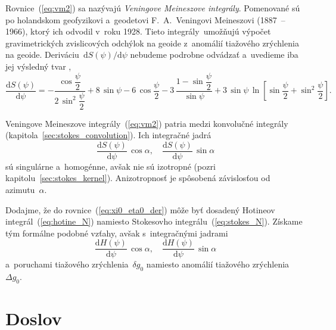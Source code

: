 \documentclass[a4paper, 12pt]{book}
\newcommand{\diff}{\mathrm d}
\begin{document}
Rovnice~(\ref{eq:vm2}) sa nazývajú \emph{Veningove Meineszove integrály}.  
Pomenované sú po holandskom geofyzikovi a~geodetovi F.~A.~Veningovi Meineszovi 
(1887~-- 1966), ktorý ich odvodil v~roku 1928.  Tieto integrály~umožňujú 
výpočet gravimetrických zvislicových odchýlok na geoide z~anomálií tiažového 
zrýchlenia na geoide.  Deriváciu~$\diff S(\psi) \slash \diff\psi$ nebudeme 
podrobne odvádzať a~uvedieme iba jej výsledný tvar
\parencite{MoritzPhysicalGeodesy},
%
\begin{equation}
\frac{\diff S(\psi)}{\diff \psi} = - \frac{\cos\dfrac{\psi}{2}}{2 \, 
\sin^2\dfrac{\psi}{2}} + 8 \, \sin\psi - 6 \, \cos\dfrac{\psi}{2} - 3\, \frac{1 
- \sin\dfrac{\psi}{2}}{\sin\psi} + 3 \, \sin\psi \, \ln \left[ 
\sin\dfrac{\psi}{2} + \sin^2\dfrac{\psi}{2} \right]{.}
\end{equation}

Veningove Meineszove integrály~(\ref{eq:vm2}) patria medzi konvolučné integrály 
(kapitola~\ref{sec:stokes_convolution}).  Ich integračné jadrá
%
\begin{equation}
\label{eq:vm_kernels}
\frac{\diff S(\psi)}{\diff\psi} \, \cos\alpha{,} \quad \frac{\diff 
S(\psi)}{\diff\psi} \, \sin\alpha
\end{equation}
%
sú singulárne a~homogénne, avšak nie sú izotropné (pozri 
kapitolu~\ref{sec:stokes_kernel}).  Anizotropnosť je spôsobená závislosťou od 
azimutu~$\alpha$.

Dodajme, že do rovnice~(\ref{eq:xi0_eta0_der}) môže byť dosadený Hotineov 
integrál~(\ref{eq:hotine_N}) namiesto Stokesovho integrálu~(\ref{eq:stokes_N}).  
Získame tým formálne podobné vzťahy, avšak s~integračnými jadrami
%
\begin{equation}
\label{eq:vm_kernels2}
\frac{\diff H(\psi)}{\diff\psi} \, \cos\alpha{,} \quad \frac{\diff 
H(\psi)}{\diff\psi} \, \sin\alpha
\end{equation}
%
a~poruchami tiažového zrýchlenia~$\delta g_0$ namiesto anomálií tiažového 
zrýchlenia~$\Delta g_0$.






\chapter*{Doslov}
\end{document}
